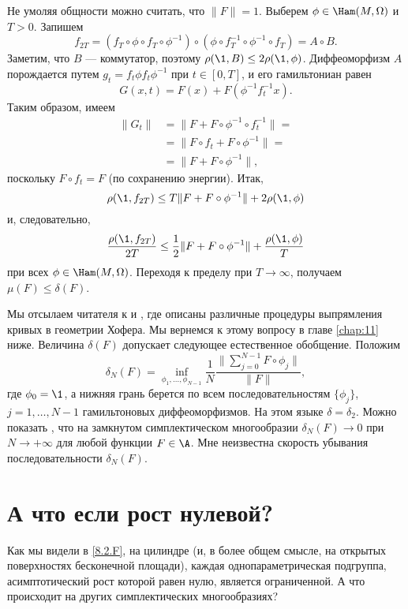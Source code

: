 Не умоляя общности можно считать, что $\|F \| = 1$.
Выберем $\phi \in \Ham (M, \Omega)$ и $T> 0$.
Запишем 
\[f_{2T}= (f_T \circ \phi \circ f_T \circ \phi^{-1}) \circ (\phi \circ f_T^{-1} \circ \phi^{-1} \circ f_T) = A \circ B.\]
Заметим, что $B$ --- коммутатор, поэтому $\rho (\1, B) \le 2\rho (\1, \phi)$.
Диффеоморфизм $A$ порождается путем $g_t = f_t \phi f_t \phi ^{-1}$ при $t \in [0, T]$, и его гамильтониан равен 
\[G (x, t) = F (x) + F (\phi^{-1} f_t^{-1} x).\]
Таким образом, имеем 
\begin{align*}
\|G_t \| &= \|F + F \circ \phi ^{-1} \circ f_t ^{-1} \| =
\\
&=\|F \circ f_t + F \circ \phi ^{-1} \| =
\\
&=\|F + F \circ \phi ^{-1} \|,\end{align*}
поскольку $F \circ f_t = F$ (по сохранению энергии).
Итак, 
\[\rho (\1, f_{2T}) \le T \| F + F \circ \phi ^{-1} \| + 2\rho (\1, \phi)\]
и, следовательно, 
\[\frac{\rho (\1, f_{2T})}{2T}
\le\frac12 \|F + F \circ \phi ^{-1} \| + \frac{\rho (\1, \phi)}{T}\]
при всех $\phi \in \Ham (M , \Omega)$.
Переходя к пределу при $T \to \infty$, получаем $\mu (F) \le \delta (F)$.
\qeds

Мы отсылаем читателя к \cite{LM2} и \cite{P9}, где описаны различные процедуры выпрямления кривых в геометрии Хофера.
Мы вернемся к этому вопросу в главе \ref{chap:11} ниже.
Величина $\delta (F)$ допускает следующее естественное обобщение.
Положим 
\[\delta_N(F)= \inf_{\phi_1 ,\dots, \phi_{N-1}}\frac1N \frac{\|\sum_{j = 0}^{N-1} F \circ \phi_j \|}{\|F \|},\]
где $\phi_0 = \1$, а нижняя грань берется по всем последовательностям $\{\phi_j\}$, $j = 1,\dots, N-1 $ гамильтоновых диффеоморфизмов.
На этом языке $\delta = \delta_2$.
Можно показать \cite{P9}, что на замкнутом симплектическом многообразии $\delta_N (F) \to 0$ при $N \to + \infty$ для любой функции $F \in \A$.
Мне неизвестна скорость убывания последовательности $\delta_N (F)$.

\section{А что если рост нулевой?}

Как мы видели в \ref{8.2.F}, на цилиндре (и, в более общем смысле, на открытых поверхностях бесконечной площади), каждая однопараметрическая подгруппа, асимптотический рост которой равен нулю, является ограниченной.
А что происходит на других симплектических многообразиях?

